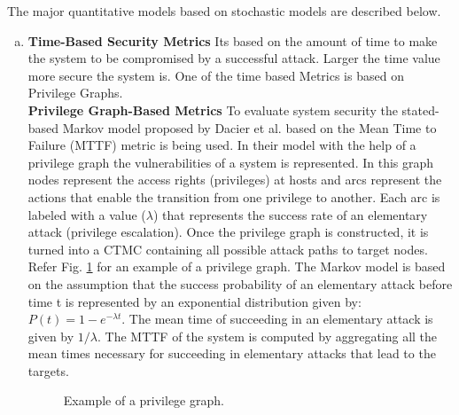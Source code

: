 \documentclass[pdftex,english,oribibl]{llncs}
\begin{document}
The major quantitative models based on stochastic models are described below.
\begin{enumerate}[(a)]
	\item {\textbf{Time-Based Security Metrics}\newline 
	Its based on the amount of time to make the system to be compromised by a successful attack. Larger the time value more secure the system is. One of the time based Metrics is based on Privilege Graphs.\\
    \textbf{Privilege Graph-Based Metrics}\newline 
	To evaluate system security the stated-based Markov model proposed by Dacier et al. \cite{Dacier1996QuantitativeAO} based on the Mean Time to Failure (MTTF) metric is being used. In their model with the help of a privilege graph the vulnerabilities of a system is represented. In this graph nodes represent the access rights (privileges) at hosts and arcs represent the actions that enable the transition from one privilege to another. Each arc is labeled with a value ($\lambda$) that represents the success rate of an elementary attack (privilege escalation). Once the privilege graph is constructed, it is turned into a CTMC containing all possible attack paths to target nodes. Refer Fig. \ref{fig:privilege_graph_example} for an example of a privilege graph.  The Markov model is based on the assumption that the success probability of an elementary attack before time t is represented by an exponential distribution given by: $P(t) = 1 - e^{-\lambda t}$. The mean time of succeeding in an elementary attack is given by $1/\lambda$. The MTTF of the system is computed by aggregating all the mean times necessary for succeeding in elementary attacks that lead to the targets.\\
		
	\begin{figure}[h]
		\centering
		\caption{Example of a privilege graph.}
		\label{fig:privilege_graph_example}
	\end{figure}
		
}
\end{enumerate}
\end{document}
